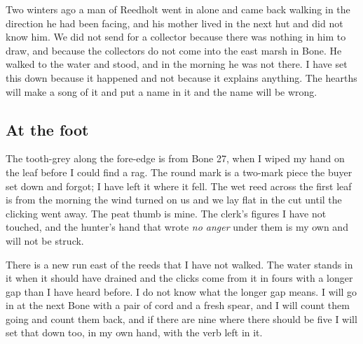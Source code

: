 \documentclass{design/chronicle}
\begin{document}
Two winters ago a man of Reedholt went in alone and came back walking in the direction he had been facing, and his mother lived in the next hut and did not know him. We did not send for a collector because there was nothing in him to draw, and because the collectors do not come into the east marsh in Bone. He walked to the water and stood, and in the morning he was not there. I have set this down because it happened and not because it explains anything. The hearths will make a song of it and put a name in it and the name will be wrong.

\subsection*{At the foot}

The tooth-grey along the fore-edge is from Bone 27, when I wiped my hand on the leaf before I could find a rag. The round mark is a two-mark piece the buyer set down and forgot; I have left it where it fell. The wet reed across the first leaf is from the morning the wind turned on us and we lay flat in the cut until the clicking went away. The peat thumb is mine. The clerk’s figures I have not touched, and the hunter’s hand that wrote \emph{no anger} under them is my own and will not be struck.

There is a new run east of the reeds that I have not walked. The water stands in it when it should have drained and the clicks come from it in fours with a longer gap than I have heard before. I do not know what the longer gap means. I will go in at the next Bone with a pair of cord and a fresh spear, and I will count them going and count them back, and if there are nine where there should be five I will set that down too, in my own hand, with the verb left in it.
\end{document}
